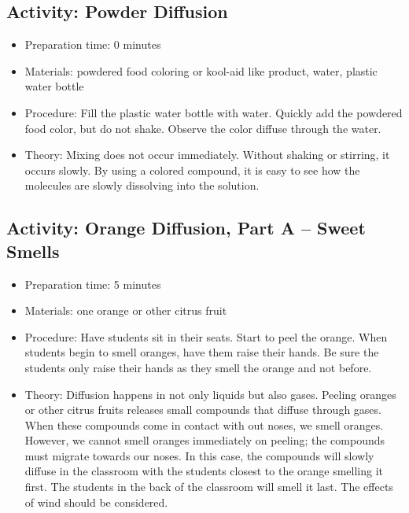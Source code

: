 \subsection{Activity: Powder Diffusion}
\begin{itemize}
\item{Preparation time: 0 minutes}
\item{Materials: powdered food coloring or kool-aid like product, water, plastic water bottle}
\item{Procedure: Fill the plastic water bottle with water. Quickly add the powdered food color, but do not shake. Observe the color diffuse through the water.}
\item{Theory: Mixing does not occur immediately. Without shaking or stirring, it occurs slowly. By using a colored compound, it is easy to see how the molecules are slowly dissolving into the solution. }
\end{itemize}

\subsection{Activity: Orange Diffusion, Part A – Sweet Smells}
\begin{itemize}
\item{Preparation time: 5 minutes}
\item{Materials: one orange or other citrus fruit}
\item{Procedure: Have students sit in their seats. Start to peel the orange. When students begin to smell oranges, have them raise their hands. Be sure the students only raise their hands as they smell the orange and not before.}
\item{Theory: Diffusion happens in not only liquids but also gases. Peeling oranges or other citrus fruits releases small compounds that diffuse through gases. When these compounds come in contact with out noses, we smell oranges. However, we cannot smell oranges immediately on peeling; the compounds must migrate towards our noses. In this case, the compounds will slowly diffuse in the classroom with the students closest to the orange smelling it first. The students in the back of the classroom will smell it last. The effects of wind should be considered.}
\end{itemize}

